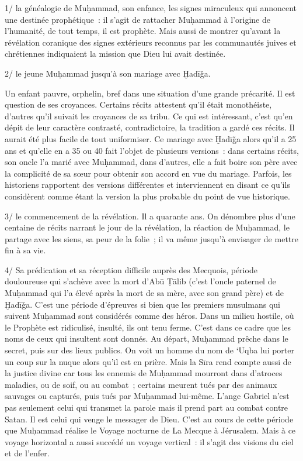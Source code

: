 1/ la généalogie de Muḥammad, son enfance, les signes miraculeux qui
annoncent une destinée prophétique~: il s'agit de rattacher Muḥammad à
l'origine de l'humanité, de tout temps, il est prophète. Mais aussi de
montrer qu'avant la révélation coranique des signes extérieurs reconnus
par les communautés juives et chrétiennes indiquaient la mission que
Dieu lui avait destinée.

2/ le jeune Muḥammad jusqu'à son mariage avec Ḫadīǧa.

Un enfant pauvre, orphelin, bref dans une situation d'une grande
précarité. Il est question de ses croyances. Certains récits attestent
qu'il était monothéiste, d'autres qu'il suivait les croyances de sa
tribu. Ce qui est intéressant, c'est qu'en dépit de leur caractère
contrasté, contradictoire, la tradition a gardé ces récits. Il aurait
été plus facile de tout uniformiser. Ce mariage avec Ḫadīǧa alors qu'il
a 25 ans et qu'elle en a 35 ou 40 fait l'objet de plusieurs versions~:
dans certains récits, son oncle l'a marié avec Muḥammad, dans d'autres,
elle a fait boire son père avec la complicité de sa sœur pour obtenir
son accord en vue du mariage. Parfois, les historiens rapportent des
versions différentes et interviennent en disant ce qu'ils considèrent
comme étant la version la plus probable du point de vue historique.

3/ le commencement de la révélation. Il a quarante ans. On dénombre plus
d'une centaine de récits narrant le jour de la révélation, la réaction
de Muḥammad, le partage avec les siens, sa peur de la folie~; il va même
jusqu'à envisager de mettre fin à sa vie.

4/ Sa prédication et sa réception difficile auprès des Mecquois, période
douloureuse qui s'achève avec la mort d'Abū Ṭālib (c'est l'oncle
paternel de Muḥammad qui l'a élevé après la mort de sa mère, avec son
grand père) et de Ḫadīǧa. C'est une période d'épreuves si bien que les
premiers musulmans qui suivent Muḥammad sont considérés comme des héros.
Dans un milieu hostile, où le Prophète est ridiculisé, insulté, ils ont
tenu ferme. C'est dans ce cadre que les noms de ceux qui insultent sont
donnés. Au départ, Muḥammad prêche dans le secret, puis sur des lieux
publics. On voit un homme du nom de `Uqba lui porter un coup sur la
nuque alors qu'il est en prière. Mais la Sīra rend compte aussi de la
justice divine car tous les ennemis de Muḥammad mourront dans d'atroces
maladies, ou de soif, ou au combat~; certains meurent tués par des
animaux sauvages ou capturés, puis tués par Muḥammad lui-même. L'ange
Gabriel n'est pas seulement celui qui transmet la parole mais il prend
part au combat contre Satan. Il est celui qui venge le messager de Dieu.
C'est au cours de cette période que Muḥammad réalise le Voyage nocturne
de La Mecque à Jérusalem. Mais à ce voyage horizontal a aussi succédé un
voyage vertical~: il s'agit des visions du ciel et de l'enfer.

